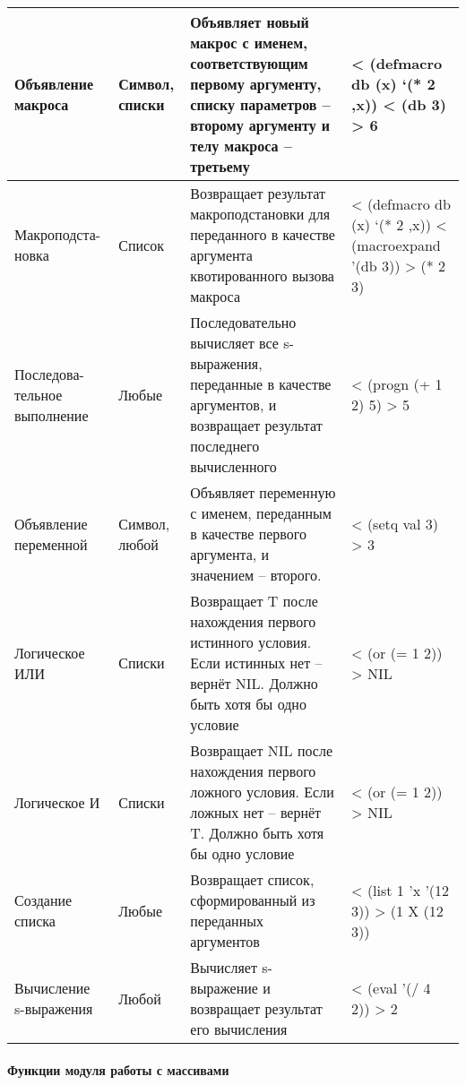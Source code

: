 \begin{xltabular}{\textwidth}{|p{3.6cm}|p{1.8cm}|p{6cm}|X|}
	Объявление макроса & Символ, списки & Объявляет новый макрос с именем, соответствующим первому аргументу, списку параметров -- второму аргументу и телу макроса -- третьему & < (defmacro db (x) `(* 2 ,x)) \linebreak < (db 3) \linebreak > 6 \\ \hline 
	Макроподста-\linebreak новка & Список & Возвращает результат макроподстановки для переданного в качестве аргумента квотированного вызова макроса & < (defmacro db (x) `(* 2 ,x)) \linebreak < (macroexpand '(db 3)) \linebreak > (* 2 3) \\ \hline 
	Последова-\linebreak тельное выполнение & Любые & Последовательно вычисляет все s-выражения, переданные в качестве аргументов, и возвращает результат последнего вычисленного & < (progn  (+ 1 2) 5) \linebreak > 5 \\ \hline 
	Объявление переменной & Символ, любой & Объявляет переменную с именем, переданным в качестве первого аргумента, и значением -- второго. & < (setq val 3) \linebreak > 3 \\ \hline 
	Логическое ИЛИ & Списки & Возвращает T после нахождения первого истинного условия. Если истинных нет -- вернёт NIL. Должно быть хотя бы одно условие & < (or (= 1 2)) \linebreak > NIL \\ \hline 
	Логическое И & Списки & Возвращает NIL после нахождения первого ложного условия. Если ложных нет -- вернёт T. Должно быть хотя бы одно условие & < (or (= 1 2)) \linebreak > NIL \\ \hline 
	Создание списка & Любые & Возвращает список, сформированный из переданных аргументов & < (list 1 'x '(12 3)) \linebreak > (1 X (12 3)) \\ \hline 
	Вычисление s-выражения & Любой & Вычисляет s-выражение и возвращает результат его вычисления & < (eval '(/ 4 2)) \linebreak > 2 \\ \hline 
\end{xltabular}

\paragraph{Функции модуля работы с массивами}

